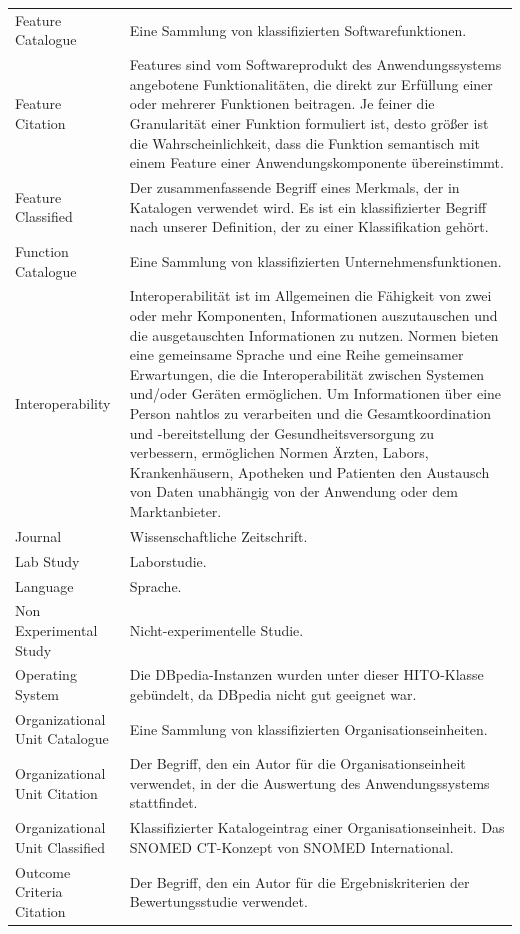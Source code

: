 \begin{longtable}[ht]{p{} p{8cm}}
Feature Catalogue & Eine Sammlung von klassifizierten Softwarefunktionen. \\
Feature Citation & Features sind vom Softwareprodukt des Anwendungssystems angebotene Funktionalitäten, die direkt zur Erfüllung einer oder mehrerer Funktionen beitragen. Je feiner die Granularität einer Funktion formuliert ist, desto größer ist die Wahrscheinlichkeit, dass die Funktion semantisch mit einem Feature einer Anwendungskomponente übereinstimmt. \\
Feature Classified & Der zusammenfassende Begriff eines Merkmals, der in Katalogen verwendet wird. Es ist ein klassifizierter Begriff nach unserer Definition, der zu einer Klassifikation gehört.  \\
Function Catalogue & Eine Sammlung von klassifizierten Unternehmensfunktionen. \\
Interoperability & Interoperabilität ist im Allgemeinen die Fähigkeit von zwei oder mehr Komponenten, Informationen auszutauschen und die ausgetauschten Informationen zu nutzen. Normen bieten eine gemeinsame Sprache und eine Reihe gemeinsamer Erwartungen, die die Interoperabilität zwischen Systemen und/oder Geräten ermöglichen. Um Informationen über eine Person nahtlos zu verarbeiten und die Gesamtkoordination und -bereitstellung der Gesundheitsversorgung zu verbessern, ermöglichen Normen Ärzten, Labors, Krankenhäusern, Apotheken und Patienten den Austausch von Daten unabhängig von der Anwendung oder dem Marktanbieter. \\
Journal & Wissenschaftliche Zeitschrift. \\
Lab Study & Laborstudie. \\
Language & Sprache. \\
Non Experimental Study & Nicht-experimentelle Studie. \\
Operating System & Die DBpedia-Instanzen wurden unter dieser HITO-Klasse gebündelt, da DBpedia nicht gut geeignet war. \\
Organizational Unit Catalogue & Eine Sammlung von klassifizierten Organisationseinheiten. \\
Organizational Unit Citation & Der Begriff, den ein Autor für die Organisationseinheit verwendet, in der die Auswertung des Anwendungssystems stattfindet. \\
Organizational Unit Classified & Klassifizierter Katalogeintrag einer Organisationseinheit. Das SNOMED CT-Konzept von SNOMED International. \\
Outcome Criteria \newline Citation & Der Begriff, den ein Autor für die Ergebniskriterien der Bewertungsstudie verwendet. \\

\end{longtable}
